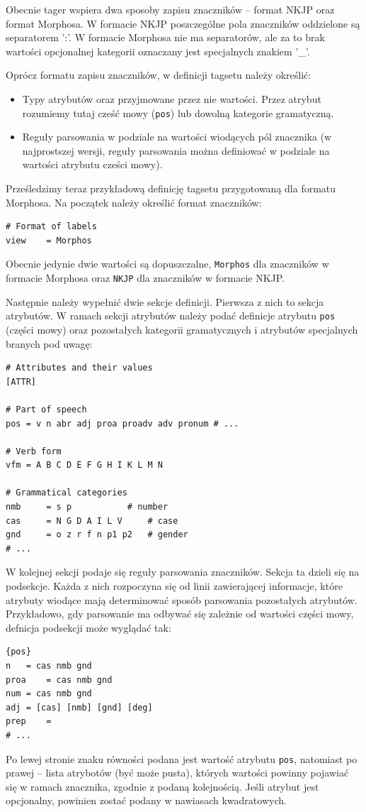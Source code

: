 \documentclass[a4paper,10]{article}
\begin{document}
Obecnie tager wspiera dwa sposoby zapisu znaczników -- format NKJP oraz
format Morphosa. W formacie NKJP poszczególne pola znaczników oddzielone
są separatorem ':'. W formacie Morphosa nie ma separatorów, ale za to
brak wartości opcjonalnej kategorii oznaczany jest specjalnych znakiem '\_'.

Oprócz formatu zapisu znaczników, w definicji tagsetu należy określić:
\begin{itemize}
\item Typy atrybutów oraz przyjmowane przez nie wartości. Przez atrybut
rozumiemy tutaj cześć mowy (\verb|pos|) lub dowolną kategorie gramatyczną.
\item Reguły parsowania w podziale na wartości wiodących
pól znacznika (w najprostszej wersji, reguły parsowania można definiować
w podziale na wartości atrybutu cześci mowy).
\end{itemize}

Prześledzimy teraz przykładową definicję tagsetu przygotowaną
dla formatu Morphosa. Na początek należy określić format znaczników:
\begin{verbatim}
# Format of labels 
view    = Morphos
\end{verbatim}
Obecnie jedynie dwie wartości są dopuszczalne, \verb|Morphos| dla znaczników
w formacie Morphosa oraz \verb|NKJP| dla znaczników w formacie NKJP.

Następnie należy wypełnić dwie sekcje definicji. Pierwsza z nich to sekcja
atrybutów. W ramach sekcji atrybutów należy podać definicje
atrybutu \verb|pos| (części mowy) oraz pozostałych kategorii
gramatycznych i atrybutów specjalnych branych pod uwagę:
\begin{verbatim}
# Attributes and their values
[ATTR]

# Part of speech
pos = v n abr adj proa proadv adv pronum # ...

# Verb form
vfm	= A B C D E F G H I K L M N

# Grammatical categories
nmb     = s p			# number
cas     = N G D A I L V		# case
gnd     = o z r f n p1 p2	# gender
# ...
\end{verbatim}

W kolejnej sekcji podaje się reguły parsowania znaczników.
Sekcja ta dzieli się na podsekcje. Każda z nich rozpoczyna
się od linii zawierającej informacje, które atrybuty wiodące
mają determinować sposób parsowania pozostałych atrybutów.
Przykładowo, gdy parsowanie ma odbywać się zależnie
od wartości części mowy, defnicja podsekcji może wyglądać tak:
\begin{verbatim}
{pos}
n	= cas nmb gnd
proa	= cas nmb gnd
num	= cas nmb gnd
adj	= [cas] [nmb] [gnd] [deg]
prep	=
# ...
\end{verbatim}
Po lewej stronie znaku równości podana jest wartość atrybutu \verb|pos|,
natomiast po prawej -- lista atrybotów (być może pusta), których wartości
powinny pojawiać się w ramach znacznika, zgodnie z podaną kolejnością.
Jeśli atrybut jest opcjonalny, powinien zostać podany w nawiasach kwadratowych.
\end{document}
